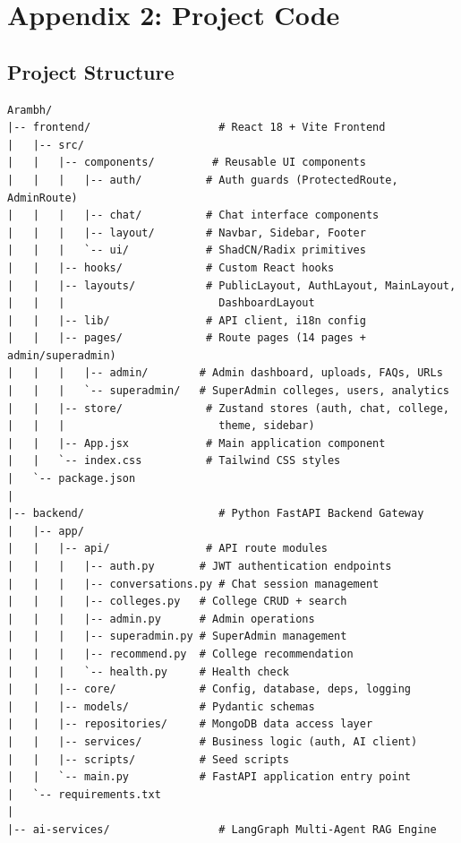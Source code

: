 \newpage
{}
\chapter*{Appendix 2: Project Code}

\section*{Project Structure}

\begin{verbatim}
Arambh/
|-- frontend/                    # React 18 + Vite Frontend
|   |-- src/
|   |   |-- components/         # Reusable UI components
|   |   |   |-- auth/          # Auth guards (ProtectedRoute, AdminRoute)
|   |   |   |-- chat/          # Chat interface components
|   |   |   |-- layout/        # Navbar, Sidebar, Footer
|   |   |   `-- ui/            # ShadCN/Radix primitives
|   |   |-- hooks/             # Custom React hooks
|   |   |-- layouts/           # PublicLayout, AuthLayout, MainLayout,
|   |   |                        DashboardLayout
|   |   |-- lib/               # API client, i18n config
|   |   |-- pages/             # Route pages (14 pages + admin/superadmin)
|   |   |   |-- admin/        # Admin dashboard, uploads, FAQs, URLs
|   |   |   `-- superadmin/   # SuperAdmin colleges, users, analytics
|   |   |-- store/             # Zustand stores (auth, chat, college,
|   |   |                        theme, sidebar)
|   |   |-- App.jsx            # Main application component
|   |   `-- index.css          # Tailwind CSS styles
|   `-- package.json
|
|-- backend/                     # Python FastAPI Backend Gateway
|   |-- app/
|   |   |-- api/               # API route modules
|   |   |   |-- auth.py       # JWT authentication endpoints
|   |   |   |-- conversations.py # Chat session management
|   |   |   |-- colleges.py   # College CRUD + search
|   |   |   |-- admin.py      # Admin operations
|   |   |   |-- superadmin.py # SuperAdmin management
|   |   |   |-- recommend.py  # College recommendation
|   |   |   `-- health.py     # Health check
|   |   |-- core/             # Config, database, deps, logging
|   |   |-- models/           # Pydantic schemas
|   |   |-- repositories/     # MongoDB data access layer
|   |   |-- services/         # Business logic (auth, AI client)
|   |   |-- scripts/          # Seed scripts
|   |   `-- main.py           # FastAPI application entry point
|   `-- requirements.txt
|
|-- ai-services/                 # LangGraph Multi-Agent RAG Engine

\end{verbatim}
